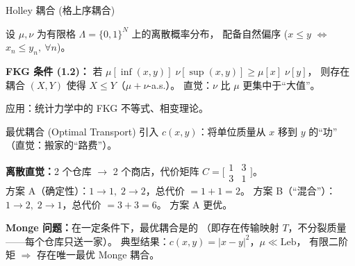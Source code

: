 \documentclass[aspectratio=169,10pt]{beamer}
\begin{document}
\begin{frame}{Holley 耦合 (格上序耦合)}
  \begin{TLtext}
    设 $\mu,\nu$ 为有限格 $\Lambda=\{0,1\}^N$ 上的离散概率分布，
    配备自然偏序 ($x\le y$ $\Leftrightarrow$ $x_n\le y_n,\ \forall n$)。
  \end{TLtext}

  \medskip
  \textbf{FKG 条件 (1.2)：}
  若 $\mu[\inf(x,y)]\;\nu[\sup(x,y)] \ge \mu[x]\;\nu[y]$，
  则存在耦合 $(X,Y)$ 使得 $X\le Y$\;（$\mu+\nu$-a.s.）。\enspace
  直觉：$\nu$ 比 $\mu$ 更集中于``大值''。

  \medskip
  {\small 应用：统计力学中的 FKG 不等式、相变理论。}
\end{frame}

\begin{frame}{最优耦合 (Optimal Transport)}
  引入 $c(x,y)$：将单位质量从 $x$ 移到 $y$ 的``功''
  （直觉：搬家的``路费''）。

  \vspace{0.3em}

  \vspace{0.3em}
  {\small\textbf{离散直觉：}2 个仓库 $\to$ 2 个商店，代价矩阵 $C=\bigl[\begin{smallmatrix}1&3\\3&1\end{smallmatrix}\bigr]$。\\
  方案 A（确定性）：$1\!\to\!1,\;2\!\to\!2$，总代价 $=1+1=2$。\;
  方案 B（``混合''）：$1\!\to\!2,\;2\!\to\!1$，总代价 $=3+3=6$。\;
  方案 A 更优。}

  \medskip
  \textbf{Monge 问题：}在一定条件下，最优耦合是的
  （即存在传输映射 $T$，不分裂质量——每个仓库只送一家）。
  典型结果：$c(x,y)=|x-y|^2$，$\mu\ll\mathrm{Leb}$，
  有限二阶矩 $\Rightarrow$ 存在唯一最优 Monge 耦合。
\end{frame}
\end{document}
